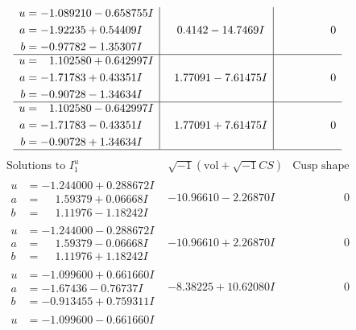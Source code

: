 \documentclass[1p]{elsarticle_modified}
\theoremstyle{definition}
\newcommand{\I}{\sqrt{-1}}
\begin{document}
$$\begin{array}{c|c|c}
\begin{aligned}
u &= -1.089210 - 0.658755 I \\
a &= -1.92235 + 0.54409 I \\
b &= -0.97782 - 1.35307 I\end{aligned}
 & \phantom{-}0.4142 - 14.7469 I & \phantom{-0.000000 } 0 \\ \hline\begin{aligned}
u &= \phantom{-}1.102580 + 0.642997 I \\
a &= -1.71783 + 0.43351 I \\
b &= -0.90728 - 1.34634 I\end{aligned}
 & \phantom{-}1.77091 - 7.61475 I & \phantom{-0.000000 } 0 \\ \hline\begin{aligned}
u &= \phantom{-}1.102580 - 0.642997 I \\
a &= -1.71783 - 0.43351 I \\
b &= -0.90728 + 1.34634 I\end{aligned}
 & \phantom{-}1.77091 + 7.61475 I & \phantom{-0.000000 } 0\\
 \hline 
 \end{array}$$\newpage$$\begin{array}{c|c|c}  
\text{Solutions to }I^u_{1}& \I (\text{vol} + \sqrt{-1}CS) & \text{Cusp shape}\\
 \hline 
\begin{aligned}
u &= -1.244000 + 0.288672 I \\
a &= \phantom{-}1.59379 + 0.06668 I \\
b &= \phantom{-}1.11976 - 1.18242 I\end{aligned}
 & -10.96610 - 2.26870 I & \phantom{-0.000000 } 0 \\ \hline\begin{aligned}
u &= -1.244000 - 0.288672 I \\
a &= \phantom{-}1.59379 - 0.06668 I \\
b &= \phantom{-}1.11976 + 1.18242 I\end{aligned}
 & -10.96610 + 2.26870 I & \phantom{-0.000000 } 0 \\ \hline\begin{aligned}
u &= -1.099600 + 0.661660 I \\
a &= -1.67436 - 0.76737 I \\
b &= -0.913455 + 0.759311 I\end{aligned}
 & -8.38225 + 10.62080 I & \phantom{-0.000000 } 0 \\ \hline\begin{aligned}
u &= -1.099600 - 0.661660 I \\

\end{aligned}
\end{array}$$
\end{document}
